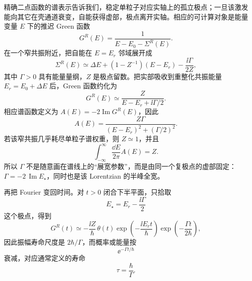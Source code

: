 
\begin{exbox}
精确二点函数的谱表示告诉我们，稳定单粒子对应实轴上的孤立极点；一旦该激发能向其它在壳通道衰变，自能获得虚部，极点离开实轴。相应的可计算对象是能量变量 $E$ 下的推迟 Green 函数
\begin{equation*}
 G^R(E)=\frac{1}{E-E_0-\Sigma^R(E)}.
\end{equation*}
在一个窄共振附近，把自能在 $E=E_r$ 邻域展开成
\begin{equation*}
 \Sigma^R(E)
 \simeq \Delta E
 +(1-Z^{-1})(E-E_r)
 -\frac{\ii\Gamma}{2Z},
\end{equation*}
其中 $\Gamma>0$ 具有能量量纲，$Z$ 是极点留数。把实部吸收到重整化共振能量 $E_r=E_0+\Delta E$ 后，Green 函数约化为
\begin{equation}
 \boxed{
 G^R(E)\simeq
 \frac{Z}{E-E_r+\ii\Gamma/2}.}
 \label{eq:dyson-pole-breit-wigner-dp65}
\end{equation}
相应谱函数定义为 $A(E)=-2\operatorname{Im}G^R(E)$，因此
\begin{equation}
 \boxed{
 A(E)=
 \frac{Z\Gamma}{(E-E_r)^2+(\Gamma/2)^2}.}
 \label{eq:dyson-lorentzian-spectral-dp65}
\end{equation}
若该窄共振几乎耗尽单粒子谱权重，则 $Z\simeq1$，并且
\begin{equation*}
 \int_{-\infty}^{\infty}\frac{\dd E}{2\pi}A(E)=Z.
\end{equation*}
所以 $\Gamma$ 不是随意画在谱线上的“展宽参数”，而是由同一个复极点的虚部固定：$\Gamma=-2\,\operatorname{Im}E_\star$，同时也是该 Lorentzian 的半峰全宽。

再把 Fourier 变回时间。对 $t>0$ 闭合下半平面，只拾取
\begin{equation*}
 E_\star=E_r-\frac{\ii\Gamma}{2}
\end{equation*}
这个极点，得到
\begin{equation*}
 G^R(t)\simeq
 -\frac{\ii Z}{\hbar}\,\theta(t)
 \exp\!\left(-\frac{\ii E_rt}{\hbar}\right)
 \exp\!\left(-\frac{\Gamma t}{2\hbar}\right),
\end{equation*}
因此振幅寿命尺度是 $2\hbar/\Gamma$，而概率或能量按
\begin{equation*}
 \ee^{-\Gamma t/\hbar}
\end{equation*}
衰减，对应通常定义的寿命
\begin{equation}
 \boxed{\tau=\frac{\hbar}{\Gamma}.}
 \label{eq:width-lifetime-si-dp65}
\end{equation}


\end{exbox}
